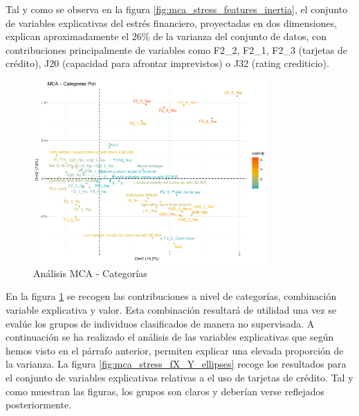 \documentclass[a4paper, 11pt]{article}
\begin{document}
Tal y como se observa en la figura \ref{fig:mca_stress_features_inertia}, el conjunto de
variables explicativas del estrés financiero, proyectadas en dos dimensiones, explican
aproximadamente el 26\% de la varianza del conjunto de datos, con contribuciones 
principalmente de variables como F2\_2, F2\_1, F2\_3 (tarjetas de crédito), J20 (capacidad
para afrontar imprevistos) o J32 (rating crediticio).

\begin{figure}[ht]
    \centering
    \includegraphics[width=0.8\textwidth]{images/mca_stress_categories.pdf} 
    \caption{Análisis MCA - Categorías}
    \label{fig:mca_stress_categories}
\end{figure}

En la figura \ref{fig:mca_stress_categories} se recogen las contribuciones a nivel 
de categorías, combinación variable explicativa y valor. Esta combinación resultará
de utilidad una vez se evalúe los grupos de individuos clasificados de manera no 
supervisada. A continuación se ha realizado el análisis de las variables explicativas 
que según hemos visto en el párrafo anterior, permiten explicar una elevada proporción
de la varianza. La figura \ref{fig:mca_stress_fX_Y_ellipses} recoge los resultados para
el conjunto de variables explicativas relativas a el uso de tarjetas de crédito. Tal
y como muestran las figuras, los grupos son claros y deberían verse reflejados posteriormente.
\end{document}
